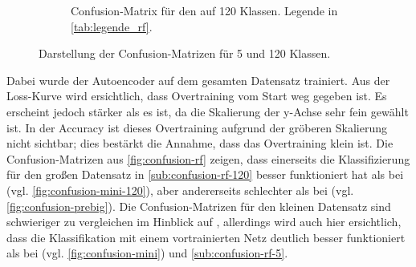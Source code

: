 \begin{figure}
\begin{subfigure}{0.49\textwidth}
    \caption{Confusion-Matrix für den \RF{} auf 120 Klassen.
    Legende in \autoref{tab:legende_rf}.}
    \label{sub:confusion-rf-120}
  \end{subfigure}
  \caption{Darstellung der Confusion-Matrizen für 5 und 120 Klassen.}
  \label{fig:confusion-rf}
\end{figure}
Dabei wurde der Autoencoder auf dem
gesamten Datensatz trainiert. Aus der Loss-Kurve wird ersichtlich, dass
Overtraining vom Start weg gegeben ist. Es erscheint jedoch stärker als es ist,
da die Skalierung der y-Achse sehr fein gewählt ist. In der Accuracy ist dieses
Overtraining aufgrund der gröberen Skalierung nicht sichtbar; dies bestärkt die
Annahme, dass das Overtraining klein ist.
Die Confusion-Matrizen aus \autoref{fig:confusion-rf} zeigen, dass einerseits
die Klassifizierung für den großen Datensatz in \autoref{sub:confusion-rf-120} besser funktioniert hat
als bei \MiniDog{} (vgl. \autoref{fig:confusion-mini-120}), aber andererseits schlechter als bei
\PreBig{} (vgl. \autoref{fig:confusion-prebig}). Die Confusion-Matrizen für den kleinen Datensatz
sind schwieriger zu vergleichen im Hinblick auf \MiniDog{}, allerdings wird auch
hier ersichtlich, dass die Klassifikation mit einem vortrainierten Netz deutlich
besser funktioniert als bei \MiniDog{} (vgl. \autoref{fig:confusion-mini}) und
\autoref{sub:confusion-rf-5}.

